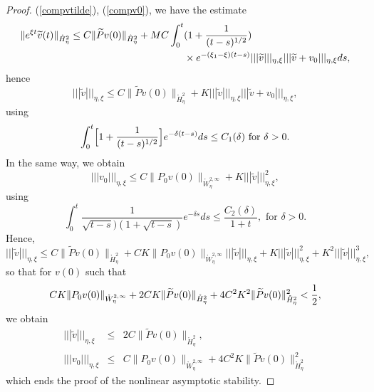\documentclass[10pt,a4paper]{amsart}
\begin{document}
\begin{proof}
(\ref{compvtilde}), (\ref{compv0}), we have the estimate%
\begin{align*}
\|e^{\xi  t}\widetilde{v}(t)\|_{\mathring{H}_{\eta}^{2}}
\leq C\|\widetilde{P}%
v(0)\|_{\mathring{H}_{\eta}^{2}}+MC\int_{0}^{t} &(1+\frac{1}{(t-s)^{1/2}}%
)
\\ 
& \times e^{-(\xi _{1}-\xi  )(t-s)}|||\widetilde{v}|||_{\eta,\xi  }|||\widetilde{%
v}+v_{0}|||_{\eta,\xi } ds,
\end{align*}%
hence%
\begin{equation*}
|||\widetilde{v}|||_{\eta,\xi }\leq C\|\widetilde{P}v(0)\|_{\mathring{H}%
_{\eta}^{2}}+K|||\widetilde{v}|||_{\eta,\xi }|||\widetilde{v}%
+v_{0}|||_{\eta,\xi  },
\end{equation*}%
using%
\begin{equation*}
\int_{0}^{t} \Bigl[ 1+\frac{1}{(t-s)^{1/2}} \Bigr] e^{-\delta (t-s)}ds\leq C_{1}(\delta )%
\text{ for }\delta >0.
\end{equation*}%
In the same way, we obtain%
\begin{equation*}
|||v_{0}|||_{\eta,\xi }\leq C\|P_{0}v(0)\|_{\mathring{W}_{\eta}^{2,\infty
}}+K|||\widetilde{v}|||_{\eta,\xi }^{2},
\end{equation*}%
using%
\begin{equation*}
\int_{0}^{t}\frac{1}{\sqrt{t-s}) (1+\sqrt{t-s})}e^{-\delta s}ds\leq \frac{C_{2}(\delta )}{1+t},\text{ for }\delta >0.
\end{equation*}%
Hence, 
\begin{equation*}
|||\widetilde{v}|||_{\eta,\xi }\leq C\|\widetilde{P}v(0)\|_{\mathring{H}%
_{\eta}^{2}}+CK\|P_{0}v(0)\|_{\mathring{W}_{\eta}^{2,\infty }}|||\widetilde{v}%
|||_{\eta,\xi }+K|||\widetilde{v}|||_{\eta,\xi }^{2}+K^{2}|||\widetilde{v}%
|||_{\eta,\xi }^{3},
\end{equation*}%
so that for $v(0)$ such that%
\begin{equation*}
CK\|P_{0}v(0)\|_{\mathring{W}_{\eta}^{2,\infty }}+2CK\|\widetilde{P}v(0)\|_{%
\mathring{H}_{\eta}^{2}}+4C^{2}K^{2}\|\widetilde{P}v(0)\|_{\mathring{H}%
_{\eta}^{2}}^{2}< \frac{1}{2},
\end{equation*}%
we obtain%
\begin{eqnarray*}
|||\widetilde{v}|||_{\eta,\xi } &\leq &2C\|\widetilde{P}v(0)\|_{\mathring{H}%
_{\eta}^{2}}, \\
|||v_{0}|||_{\eta,\xi } &\leq &C\|P_{0}v(0)\|_{\mathring{W}_{\eta}^{2,\infty
}}+4C^{2}K\|\widetilde{P}v(0)\|_{\mathring{H}_{\eta}^{2}}^{2}
\end{eqnarray*}%
which ends the proof of the nonlinear asymptotic stability.
\end{proof}
\end{document}
